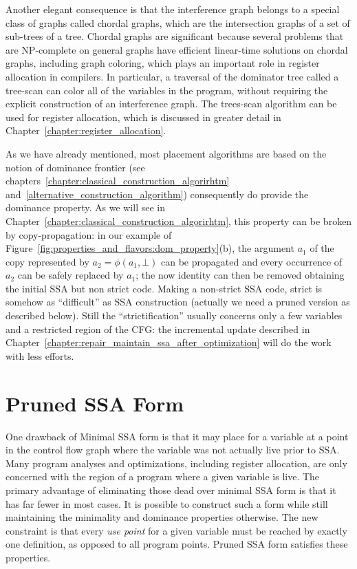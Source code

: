 Another elegant consequence is that the interference graph belongs to a special class of
graphs called chordal graphs, which are the intersection graphs of a set
of sub-trees of a tree. Chordal graphs are significant because several
problems that are NP-complete on general graphs have efficient linear-time
solutions on chordal graphs, including graph coloring, which plays
an important role in register allocation in compilers. In particular,
a traversal of the dominator tree called a tree-scan can color all of
the variables in the program, without requiring the explicit construction
of an interference graph. The trees-scan algorithm can be used
for register allocation, which is discussed
in greater detail in Chapter~\ref{chapter:register_allocation}. 

As we have already mentioned, most \phifun placement algorithms are based on the notion of dominance frontier (see chapters~\ref{chapter:classical_construction_algorirhtm} and~\ref{alternative_construction_algorithm}) consequently do provide the dominance property. As we will see in Chapter~\ref{chapter:classical_construction_algorirhtm}, this property can be broken by copy-propagation: in our example of Figure~\ref{fig:properties_and_flavors:dom_property}(b), the argument $a_1$ of the copy represented by $a_2=\phi(a_1,\bot)$ can be propagated and every occurrence of $a_2$ can be safely replaced by $a_1$; the now identity \phifun can then be removed obtaining the initial SSA but non strict code. Making a non-strict SSA code, strict is somehow as ``difficult'' as SSA construction (actually we need a pruned version as described below). Still the ``strictification'' usually concerns only a few variables and a restricted region of the CFG: the incremental update described in Chapter~\ref{chapter:repair_maintain_ssa_after_optimization} will do the work with less efforts.

\section{Pruned SSA Form}
\label{sec-prop-pruned}

One drawback of Minimal SSA form is that it may place \phifuns
for a variable at a point in the control flow graph where the variable was
not actually live prior to SSA. Many program analyses and optimizations,
including register allocation, are only concerned with the region of a 
program where a given variable is live. 
The primary advantage of eliminating those dead \phifuns over minimal SSA form
is that it has far fewer \phifuns in most cases.  
It is possible to construct such a form while still maintaining the minimality
and dominance properties otherwise. The new constraint is that every
\emph{use point} for a given variable must be reached by exactly one
definition, as opposed to all program points. Pruned SSA form satisfies these properties. 

